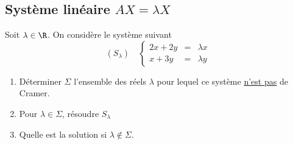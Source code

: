 
\subsection{Système linéaire $AX=\lambda X$}

\begin{exercice}
Soit $\lambda \in \R$. On considère le système suivant 
$$(S_\lambda)\quad  \left\{ \begin{array}{ccc}
2x +2y & =& \lambda x\\
x +3y  & =& \lambda y 
\end{array}\right. $$

\begin{enumerate}
\item Déterminer $\Sigma$ l'ensemble des réels $\lambda$ pour lequel ce système \underline{n'est pas} de Cramer. 
\item Pour $\lambda \in \Sigma$, résoudre $S_\lambda$
\item Quelle est la solution si $\lambda \notin \Sigma$. 
\end{enumerate}
\end{exercice}

